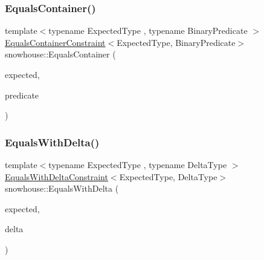 \subsubsection{\texorpdfstring{EqualsContainer()}{EqualsContainer()}\hspace{0.1cm}{\footnotesize\ttfamily [2/2]}}
{\footnotesize\ttfamily template$<$typename Expected\+Type , typename Binary\+Predicate $>$ \\
\mbox{\hyperlink{structsnowhouse_1_1EqualsContainerConstraint}{Equals\+Container\+Constraint}}$<$Expected\+Type, Binary\+Predicate$>$ snowhouse\+::\+Equals\+Container (\begin{DoxyParamCaption}\item[{const Expected\+Type \&}]{expected,  }\item[{const Binary\+Predicate}]{predicate }\end{DoxyParamCaption})\hspace{0.3cm}{\ttfamily [inline]}}

\mbox{\label{namespacesnowhouse_acfa1166262faee83b9871f0037d00208}} 
\subsubsection{\texorpdfstring{EqualsWithDelta()}{EqualsWithDelta()}}
{\footnotesize\ttfamily template$<$typename Expected\+Type , typename Delta\+Type $>$ \\
\mbox{\hyperlink{structsnowhouse_1_1EqualsWithDeltaConstraint}{Equals\+With\+Delta\+Constraint}}$<$Expected\+Type, Delta\+Type$>$ snowhouse\+::\+Equals\+With\+Delta (\begin{DoxyParamCaption}\item[{const Expected\+Type \&}]{expected,  }\item[{const Delta\+Type \&}]{delta }\end{DoxyParamCaption})\hspace{0.3cm}{\ttfamily [inline]}}

\mbox{\label{namespacesnowhouse_a1b09fb05d70181243b91194c3373352d}} 
